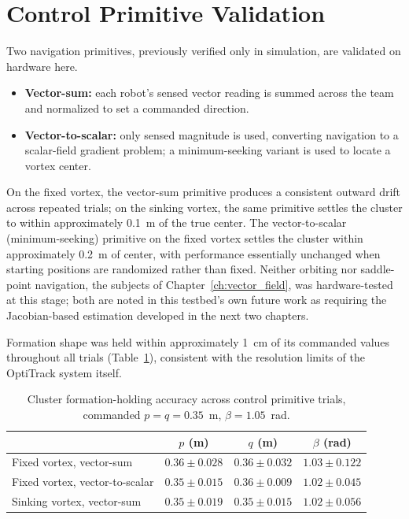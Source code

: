 \documentclass[12pt, letterpaper, oneside]{report}
\begin{document}
\section{Control Primitive Validation}
\label{sec:testbed_primitives}

Two navigation primitives, previously verified only in simulation, are
validated on hardware here.

\begin{itemize}
\item \textbf{Vector-sum:} each robot's sensed vector reading is summed
  across the team and normalized to set a commanded direction.
\item \textbf{Vector-to-scalar:} only sensed magnitude is used, converting
  navigation to a scalar-field gradient problem; a minimum-seeking variant
  is used to locate a vortex center.
\end{itemize}

On the fixed vortex, the vector-sum primitive produces a consistent outward
drift across repeated trials; on the sinking vortex, the same primitive
settles the cluster to within approximately 0.1~m of the true center. The
vector-to-scalar (minimum-seeking) primitive on the fixed vortex settles the
cluster within approximately 0.2~m of center, with performance essentially
unchanged when starting positions are randomized rather than fixed. Neither
orbiting nor saddle-point navigation, the subjects of
Chapter~\ref{ch:vector_field}, was hardware-tested at this stage; both are
noted in this testbed's own future work as requiring the Jacobian-based
estimation developed in the next two chapters.

Formation shape was held within approximately 1~cm of its commanded values
throughout all trials (Table~\ref{tab:testbed_formation}), consistent with
the resolution limits of the OptiTrack system itself.

\begin{table}[h]
\centering
\caption{Cluster formation-holding accuracy across control primitive trials,
commanded $p=q=0.35$~m, $\beta=1.05$~rad.}
\label{tab:testbed_formation}
\begin{tabular}{lccc}
\toprule
 & $p$ (m) & $q$ (m) & $\beta$ (rad) \\
\midrule
Fixed vortex, vector-sum & $0.36 \pm 0.028$ & $0.36 \pm 0.032$ & $1.03 \pm 0.122$ \\
Fixed vortex, vector-to-scalar & $0.35 \pm 0.015$ & $0.36 \pm 0.009$ & $1.02 \pm 0.045$ \\
Sinking vortex, vector-sum & $0.35 \pm 0.019$ & $0.35 \pm 0.015$ & $1.02 \pm 0.056$ \\
\bottomrule
\end{tabular}
\end{table}
\end{document}
